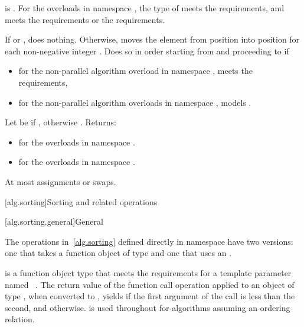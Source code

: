 \begin{itemdescr}
\pnum
\expects
{} is .
For the overloads in namespace ,
the type of  meets the  requirements,
and  meets
the  requirements or
the  requirements.

\pnum
\effects
If  or , does nothing.
Otherwise, moves the element
from position  into position 
for each non-negative integer .
Does so in order starting
from  and proceeding to  if
\begin{itemize}
\item
for the non-parallel algorithm overload in namespace ,
 meets the  requirements,
\item
for the non-parallel algorithm overloads in namespace ,
 models .
\end{itemize}

\pnum
\returns
Let  be  if ,
otherwise .
Returns:
\begin{itemize}
\item
{} for the overloads in namespace .
\item
{}
for the overloads in namespace .
\end{itemize}

\pnum
\complexity
At most  assignments or swaps.
\end{itemdescr}

[alg.sorting]{Sorting and related operations}

[alg.sorting.general]{General}

\pnum
The operations in~\ref{alg.sorting} defined directly in namespace 
have two versions:
one that takes a function object of type  and
one that uses an .

\pnum
{} is a function object type
that meets the requirements for a template parameter
named ~.
The return value of the function call operation
applied to an object of type ,
when converted to ,
yields 
if the first argument of the call is less than the second, and
 otherwise.
 is used throughout
for algorithms assuming an ordering relation.

